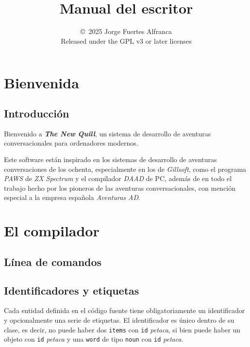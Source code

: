 \documentclass{report}
\title{\tnq\\ \large Manual del escritor}
\author{\copyright\ 2025 Jorge Fuertes Alfranca \\ \small Released under the GPL v3 or later licenses}
\newcommand{\tnq}{\textbf{\textit{The New Quill}}}
\newcommand{\ic}[1]{\texttt{#1}}
\newcommand{\la}[1]{\textit{#1}}
\begin{document}
\maketitle
\tableofcontents
\newpage

\chapter{Bienvenida}
    \section{Introducción}
        Bienvenido a \tnq, un sistema de desarrollo de aventuras conversacionales para ordenadores modernos.
        
        Este software están inspirado en los sistemas de desarrollo de aventuras conversaciones de los ochenta,
        especialmente en los de \textit{Gillsoft}, como el programa \textit{PAWS} de \textit{ZX Spectrum} y el
        compilador \textit{DAAD} de PC, además de en todo el trabajo hecho por los pioneros de las aventuras
        conversacionales, con mención especial a la empresa española \textit{Aventuras AD}.

\chapter{El compilador}        
    \section{Línea de comandos}
    \section{Identificadores y etiquetas}
        Cada entidad definida en el código fuente tiene obligatoriamente un identificador y opcionalmente una serie de
        etiquetas. El identificador es único dentro de su clase, es decir, no puede haber dos \ic{items} con \ic{id}
        \la{petaca}, si bien puede haber un objeto con \ic{id} \la{petaca} y una \ic{word} de tipo \ic{noun} con \ic{id}
        \la{petaca}.
\end{document}
